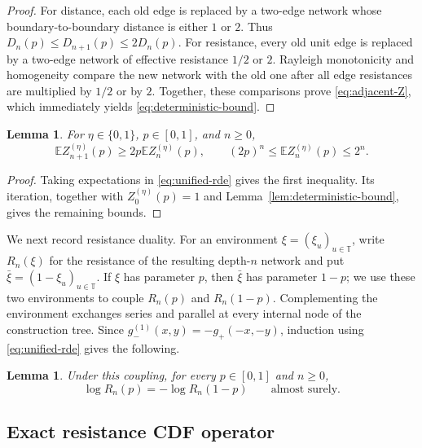 \documentclass[12pt,preprint]{amsart}
\numberwithin{equation}{section}
\theoremstyle{plain}
\newtheorem{lemma}[theorem]{Lemma}
\theoremstyle{definition}
\newcommand{\E}{\mathbb E}
\begin{document}
\begin{proof}
For distance, each old edge is replaced by a two-edge network whose
boundary-to-boundary distance is either $1$ or $2$.  Thus
$D_n(p)\le D_{n+1}(p)\le2D_n(p)$.  For resistance, every old unit edge is
replaced by a two-edge network of effective resistance $1/2$ or $2$.
Rayleigh monotonicity and homogeneity compare the new network with the old one
after all edge resistances are multiplied by $1/2$ or by $2$.  Together,
these comparisons prove \eqref{eq:adjacent-Z}, which immediately yields
\eqref{eq:deterministic-bound}.
\end{proof}

\begin{lemma}
\label{lem:first-moment-bounds}
For $\eta\in\{0,1\}$, $p\in[0,1]$, and $n\ge0$,
\begin{equation}
 \E Z_{n+1}^{(\eta)}(p)\ge2p\E Z_n^{(\eta)}(p),
 \qquad
 (2p)^n\le\E Z_n^{(\eta)}(p)\le2^n.
 \label{eq:first-moment-recursion}
\end{equation}
\end{lemma}

\begin{proof}
Taking expectations in \eqref{eq:unified-rde} gives the first inequality.
Its iteration, together with $Z_0^{(\eta)}(p)=1$ and
Lemma~\ref{lem:deterministic-bound}, gives the remaining bounds.
\end{proof}

We next record resistance duality.  For an
environment $\xi=(\xi_u)_{u\in\mathbb T}$, write $R_n(\xi)$ for the
resistance of the resulting depth-$n$ network and put
$\bar\xi=(1-\xi_u)_{u\in\mathbb T}$.  If $\xi$ has parameter $p$, then
$\bar\xi$ has parameter $1-p$; we use these two environments to couple
$R_n(p)$ and $R_n(1-p)$.  Complementing the environment exchanges series
and parallel at every internal node of the construction tree.  Since
$g_-^{(1)}(x,y)=-g_+(-x,-y)$, induction using
\eqref{eq:unified-rde} gives the following.

\begin{lemma}
\label{lem:resistance-duality}
Under this coupling, for every $p\in[0,1]$ and $n\ge0$,
\begin{equation}
 \log R_n(p)=-\log R_n(1-p)
 \qquad\text{almost surely}.
 \label{eq:resistance-duality}
\end{equation}
\end{lemma}

\subsection{Exact resistance CDF operator}
\label{sec:cdf-operator}
\end{document}
